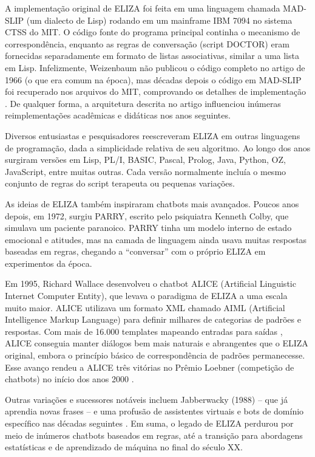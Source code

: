 \documentclass[a4paper,oneside]{book}
\begin{document}
A implementação original de ELIZA foi feita em uma linguagem chamada MAD-SLIP (um dialecto de Lisp) rodando em um mainframe IBM 7094 no sistema CTSS do MIT. O código fonte do programa principal continha o mecanismo de correspondência, enquanto as regras de conversação (script DOCTOR) eram fornecidas separadamente em formato de listas associativas, similar a uma lista em Lisp. Infelizmente, Weizenbaum não publicou o código completo no artigo de 1966 (o que era comum na época), mas décadas depois o código em MAD-SLIP foi recuperado nos arquivos do MIT, comprovando os detalhes de implementação \cite{Lane2025}. De qualquer forma, a arquitetura descrita no artigo influenciou inúmeras reimplementações acadêmicas e didáticas nos anos seguintes.

Diversos entusiastas e pesquisadores reescreveram ELIZA em outras linguagens de programação, dada a simplicidade relativa de seu algoritmo. Ao longo dos anos surgiram versões em Lisp, PL/I, BASIC, Pascal, Prolog, Java, Python, OZ, JavaScript, entre muitas outras. Cada versão normalmente incluía o mesmo conjunto de regras do script terapeuta ou pequenas variações.

As ideias de ELIZA também inspiraram chatbots mais avançados. Poucos anos depois, em 1972, surgiu PARRY, escrito pelo psiquiatra Kenneth Colby, que simulava um paciente paranoico. PARRY tinha um modelo interno de estado emocional e atitudes, mas na camada de linguagem ainda usava muitas respostas baseadas em regras, chegando a “conversar” com o próprio ELIZA em experimentos da época.

Em 1995, Richard Wallace desenvolveu o chatbot ALICE (Artificial Linguistic Internet Computer Entity), que levava o paradigma de ELIZA a uma escala muito maior. ALICE utilizava um formato XML chamado AIML (Artificial Intelligence Markup Language) para definir milhares de categorias de padrões e respostas. Com mais de 16.000 templates mapeando entradas para saídas \cite{Wallace2000}, ALICE conseguia manter diálogos bem mais naturais e abrangentes que o ELIZA original, embora o princípio básico de correspondência de padrões permanecesse. Esse avanço rendeu a ALICE três vitórias no Prêmio Loebner (competição de chatbots) no início dos anos 2000 \cite{Wallace2000}.

Outras variações e sucessores notáveis incluem Jabberwacky (1988) – que já aprendia novas frases – e uma profusão de assistentes virtuais e bots de domínio específico nas décadas seguintes \cite{Wallace2000}. Em suma, o legado de ELIZA perdurou por meio de inúmeros chatbots baseados em regras, até a transição para abordagens estatísticas e de aprendizado de máquina no final do século XX.
\end{document}
